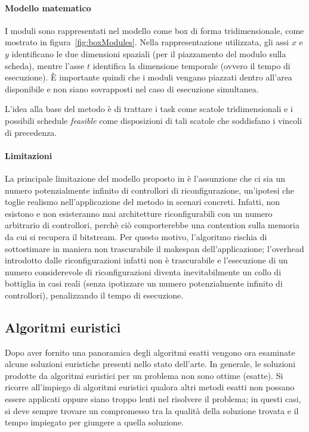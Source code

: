 
\paragraph{Modello matematico}
I moduli sono rappresentati nel modello come box di forma tridimensionale, come 
mostrato in figura~\ref{fig:boxModules}. Nella rappresentazione utilizzata, gli 
assi $x$ e $y$ identificano le due dimensioni spaziali (per il piazzamento del 
modulo sulla scheda), mentre l'asse $t$ identifica la dimensione temporale 
(ovvero il tempo di esecuzione). È importante quindi che i moduli vengano 
piazzati dentro all'area disponibile e non siano sovrapposti nel caso di esecuzione
simultanea.

L'idea alla base del metodo è di trattare i task come scatole tridimensionali e 
i possibili schedule \emph{feasible} come disposizioni di tali scatole che 
soddisfano i vincoli di precedenza.

\paragraph{Limitazioni}
La principale limitazione del modello proposto in \cite{FeketeOptimal} è 
l'assunzione che ci sia un numero potenzialmente infinito di controllori di 
riconfigurazione, un'ipotesi che toglie realismo nell'applicazione del metodo 
in scenari concreti. Infatti, non esistono e non esisteranno mai architetture
riconfigurabili con un numero arbitrario di controllori, perch\`e ci\`o comporterebbe
una contention sulla memoria da cui si recupera il bitstream.
Per questo motivo, l'algoritmo \cite{FeketeOptimal} rischia di sottostimare in maniera
non trascurabile il makespan dell'applicazione; l'overhead introdotto dalle riconfigurazioni
infatti non è trascurabile e l'esecuzione di un numero considerevole di riconfigurazioni 
diventa inevitabilmente un collo di bottiglia in casi reali (senza ipotizzare un numero
potenzialmente infinito di controllori), penalizzando il tempo di 
esecuzione.


\subsection{Algoritmi euristici}
\label{sec:algoritmiEuristici}
Dopo aver fornito una panoramica degli algoritmi esatti vengono ora esaminate 
alcune soluzioni euristiche presenti nello stato dell'arte. In generale, le 
soluzioni prodotte da algoritmi euristici per un problema non sono ottime 
(esatte). Si ricorre all'impiego di algoritmi euristici qualora altri metodi 
esatti non possano essere applicati oppure siano troppo lenti nel risolvere il 
problema; in questi casi, si deve sempre trovare un compromesso tra la 
qualità della soluzione trovata e il tempo impiegato per giungere a quella 
soluzione.

